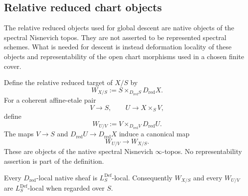 \subsection{Relative reduced chart objects}

The relative reduced objects used for global descent are native objects of the
spectral Nisnevich topos.  They are not asserted to be represented spectral
schemes.  What is needed for descent is instead deformation locality of these
objects and representability of the open chart morphisms used in a chosen
finite cover.

\begin{definition}
\label{def:bnli-relative-reduced-chart}
Define the relative reduced target of $X/S$ by
\[
\boxed{
    W_{X/S}
    :=
    S\times_{D_{\mathrm{red}}S}D_{\mathrm{red}}X.}
\]
For a coherent affine-etale pair
\[
    V\longrightarrow S,
    \qquad
    U\longrightarrow X\times_SV,
\]
define
\[
\boxed{
    W_{U/V}
    :=
    V\times_{D_{\mathrm{red}}V}D_{\mathrm{red}}U.}
\]
The maps $V\to S$ and $D_{\mathrm{red}}U\to D_{\mathrm{red}}X$ induce a
canonical map
\[
    W_{U/V}\longrightarrow W_{X/S}.
\]
These are objects of the native spectral Nisnevich $\infty$-topos.  No
representability assertion is part of the definition.
\end{definition}

\begin{lemma}
\label{lem:bnli-dred-implies-def}
Every $D_{\mathrm{red}}$-local native sheaf is
$L_S^{\mathrm{Def}}$-local.  Consequently $W_{X/S}$ and every $W_{U/V}$ are
$L_S^{\mathrm{Def}}$-local when regarded over $S$.
\end{lemma}

